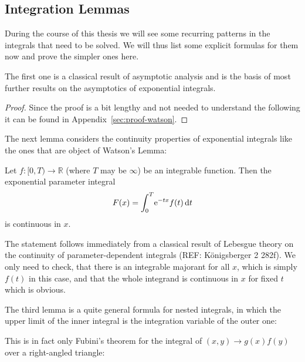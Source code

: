 \subsection{Integration Lemmas}
During the course of this thesis we will see some recurring patterns in the
integrals that need to be solved. We will thus list some explicit formulas for
them now and prove the simpler ones here.

The first one is a classical result of asymptotic analysis and is the basis of
most further results on the asymptotics of exponential integrals.
\begin{Lemma}[Watson]
  
  \begin{proof}
    Since the proof is a bit lengthy and not needed to understand the following
    it can be found in Appendix~\ref{sec:proof-watson}.
  \end{proof}
\end{Lemma}

The next lemma considers the continuity properties of exponential integrals like
the ones that are object of Watson's Lemma:
\begin{Lemma}
  \label{lem:continuity_of_watson_integrals}
  Let $f\colon [0,T)\to\mathbb{R}$ (where $T$ may be $\infty$) be an integrable
  function. Then the exponential parameter integral
  \begin{align*}
    F(x) = \Integ[T]{0}{t}{\Eto{-tx} f(t)}
  \end{align*}
  is continuous in $x$.
  \begin{Proof}
    The statement follows immediately from a classical result of Lebesgue theory
    on the continuity of parameter-dependent integrals (REF: Königsberger 2
    282f). We only need to check, that there is an integrable majorant for all
    $x$, which is simply $f(t)$ in this case, and that the whole integrand is
    continuous in $x$ for fixed $t$ which is obvious.
  \end{Proof}
\end{Lemma}

The third lemma is a quite general formula for nested integrals, in which the
upper limit of the inner integral is the integration variable of the outer one:

\begin{Remark}
  This is in fact only Fubini's theorem for the integral of $(x,y)\to g(x)f(y)$
  over a right-angled triangle:
  \begin{center}
  \end{center}
\end{Remark}

